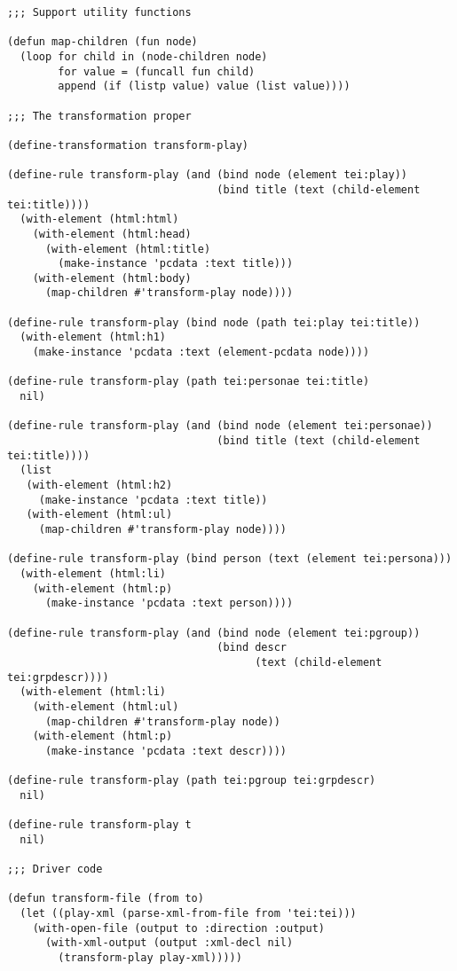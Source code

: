 \documentclass[a4paper,11pt]{scrartcl}
\begin{document}
\begin{verbatim}
;;; Support utility functions

(defun map-children (fun node)
  (loop for child in (node-children node)
        for value = (funcall fun child)
        append (if (listp value) value (list value))))

;;; The transformation proper

(define-transformation transform-play)

(define-rule transform-play (and (bind node (element tei:play))
                                 (bind title (text (child-element tei:title))))
  (with-element (html:html)
    (with-element (html:head)
      (with-element (html:title)
        (make-instance 'pcdata :text title)))
    (with-element (html:body)
      (map-children #'transform-play node))))

(define-rule transform-play (bind node (path tei:play tei:title))
  (with-element (html:h1)
    (make-instance 'pcdata :text (element-pcdata node))))

(define-rule transform-play (path tei:personae tei:title)
  nil)

(define-rule transform-play (and (bind node (element tei:personae))
                                 (bind title (text (child-element tei:title))))
  (list
   (with-element (html:h2)
     (make-instance 'pcdata :text title))
   (with-element (html:ul)
     (map-children #'transform-play node))))

(define-rule transform-play (bind person (text (element tei:persona)))
  (with-element (html:li)
    (with-element (html:p)
      (make-instance 'pcdata :text person))))

(define-rule transform-play (and (bind node (element tei:pgroup))
                                 (bind descr
                                       (text (child-element tei:grpdescr))))
  (with-element (html:li)
    (with-element (html:ul)
      (map-children #'transform-play node))
    (with-element (html:p)
      (make-instance 'pcdata :text descr))))
      
(define-rule transform-play (path tei:pgroup tei:grpdescr)
  nil)

(define-rule transform-play t
  nil)

;;; Driver code

(defun transform-file (from to)
  (let ((play-xml (parse-xml-from-file from 'tei:tei)))
    (with-open-file (output to :direction :output)
      (with-xml-output (output :xml-decl nil)
        (transform-play play-xml)))))
\end{verbatim}
\end{document}
